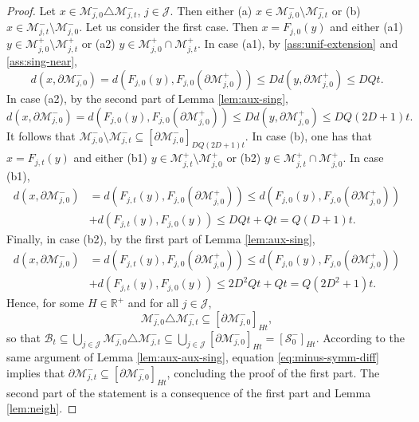 \documentclass{amsart}
\numberwithin{equation}{section}
\renewcommand{\le}{\leqslant}
\newcommand\cB{{\mathcal B}}
\newcommand\cJ{{\mathcal J}}
\newcommand\cM{{\mathcal M}}
\newcommand\cS{{\mathcal S}}
\newcommand\bR{{\mathbb R}}
\begin{document}
\begin{proof}
Let \(x \in \cM_{j,0}^{-} \triangle \cM_{j,t}^{-}\), \(j \in \cJ\). Then either (a) \(x \in \cM_{j,0}^{-} \setminus \cM_{j,t}^{-}\) or (b) \(x \in \cM_{j,t}^{-} \setminus \cM_{j,0}^{-}\). Let us consider the first case. Then \(x = F_{j,0}(y)\) and either (a1) \(y \in \cM_{j,0}^{+} \setminus \cM_{j,t}^{+}\) or (a2) \(y \in \cM_{j,0}^+ \cap \cM_{j,t}^{+} \). In case (a1), by \ref{ass:unif-extension} and \ref{ass:sing-near},
\[
 d(x, \partial \cM_{j,0}^{-}) = d(F_{j,0}(y),  F_{j,0}(\partial \cM_{j,0}^{+})) \le D d(y, \partial \cM_{j,0}^{+}) \le DQt.
\]
In case (a2), by the second part of Lemma \ref{lem:aux-sing},
\[
 d(x, \partial \cM_{j,0}^{-}) = d(F_{j,0}(y),  F_{j,0}(\partial \cM_{j,0}^{+}))  \le Dd(y, \partial \cM_{j,0}^{+}) \le DQ(2D+1)t.
\]
It follows that \( \cM_{j,0}^{-} \setminus \cM_{j,t}^{-} \subseteq [\partial \cM_{j,0}^{-}]_{DQ(2D+1)t}\). In case (b), one has that \(x = F_{j,t}(y)\) and either (b1) \(y \in \cM_{j,t}^{+} \setminus \cM_{j,0}^{+}\) or (b2) \(y \in \cM_{j,t}^{+} \cap \cM_{j,0}^{+} \). In case (b1),
\[
\begin{split}
d\left(x, \partial \cM_{j,0}^{-} \right) &= d\left(F_{j,t}(y), F_{j,0}\left(\partial \cM_{j,0}^{+}\right) \right) \le d\left(F_{j,0}(y), F_{j,0}\left(\partial \cM_{j,0}^{+}\right) \right) \\
&+ d\left(F_{j,t}(y), F_{j,0}(y) \right) \le DQt + Qt = Q(D+1)t.
\end{split}
\]
Finally, in case (b2), by the first part of Lemma \ref{lem:aux-sing}, 
\[
\begin{split}
d\left(x, \partial \cM_{j,0}^{-} \right) &= d\left(F_{j,t}(y), F_{j,0}\left(\partial \cM_{j,0}^{+}\right) \right) \le d\left(F_{j,0}(y), F_{j,0}\left(\partial \cM_{j,0}^{+}\right) \right) \\
&+ d\left(F_{j,t}(y), F_{j,0}(y) \right) \le 2D^2 Qt + Qt = Q(2D^2+1)t.
\end{split}
\]
Hence, for some \(H \in \bR^{+}\) and for all \(j \in \cJ\),
\begin{equation}\label{eq:minus-symm-diff}
     \cM_{j,0}^{-} \triangle \cM_{j,t}^{-} \subseteq [\partial \cM_{j,0}^{-}]_{Ht},
\end{equation}
so that \(\cB_{t} \subseteq \bigcup_{j \in \cJ}\cM_{j,0}^{-}\triangle \cM_{j,t}^{-} \subseteq \bigcup_{j \in \cJ} [\partial \cM_{j,0}^-]_{Ht} = [\cS_0^{-}]_{Ht}\). According to the same argument of Lemma \ref{lem:aux-aux-sing}, equation \eqref{eq:minus-symm-diff} implies that \(\partial \cM_{j,t}^{-} \subseteq [\partial \cM_{j,0}^{-}]_{Ht}\), concluding the proof of the first part. The second part of the statement is a consequence of the first part and Lemma \ref{lem:neigh}.
\end{proof}
\end{document}
